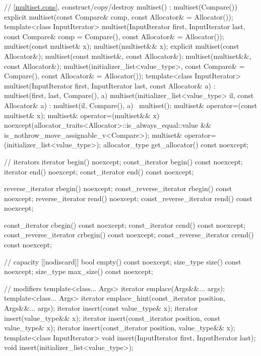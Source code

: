 \begin{codeblock}
{{    // \ref{multiset.cons}, construct/copy/destroy
    multiset() : multiset(Compare()) { }
    explicit multiset(const Compare& comp, const Allocator& = Allocator());
    template<class InputIterator>
      multiset(InputIterator first, InputIterator last,
               const Compare& comp = Compare(), const Allocator& = Allocator());
    multiset(const multiset& x);
    multiset(multiset&& x);
    explicit multiset(const Allocator&);
    multiset(const multiset&, const Allocator&);
    multiset(multiset&&, const Allocator&);
    multiset(initializer_list<value_type>, const Compare& = Compare(),
             const Allocator& = Allocator());
    template<class InputIterator>
      multiset(InputIterator first, InputIterator last, const Allocator& a)
        : multiset(first, last, Compare(), a) { }
    multiset(initializer_list<value_type> il, const Allocator& a)
      : multiset(il, Compare(), a) { }
    ~multiset();
    multiset& operator=(const multiset& x);
    multiset& operator=(multiset&& x)
      noexcept(allocator_traits<Allocator>::is_always_equal::value &&
               is_nothrow_move_assignable_v<Compare>);
    multiset& operator=(initializer_list<value_type>);
    allocator_type get_allocator() const noexcept;

    // iterators
    iterator               begin() noexcept;
    const_iterator         begin() const noexcept;
    iterator               end() noexcept;
    const_iterator         end() const noexcept;

    reverse_iterator       rbegin() noexcept;
    const_reverse_iterator rbegin() const noexcept;
    reverse_iterator       rend() noexcept;
    const_reverse_iterator rend() const noexcept;

    const_iterator         cbegin() const noexcept;
    const_iterator         cend() const noexcept;
    const_reverse_iterator crbegin() const noexcept;
    const_reverse_iterator crend() const noexcept;

    // capacity
    [[nodiscard]] bool empty() const noexcept;
    size_type size() const noexcept;
    size_type max_size() const noexcept;

    // modifiers
    template<class... Args> iterator emplace(Args&&... args);
    template<class... Args> iterator emplace_hint(const_iterator position, Args&&... args);
    iterator insert(const value_type& x);
    iterator insert(value_type&& x);
    iterator insert(const_iterator position, const value_type& x);
    iterator insert(const_iterator position, value_type&& x);
    template<class InputIterator>
      void insert(InputIterator first, InputIterator last);
    void insert(initializer_list<value_type>);

}}
\end{codeblock}
